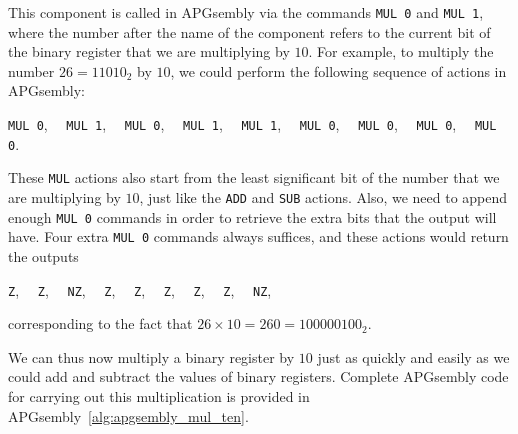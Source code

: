 This component is called in APGsembly via the commands \texttt{MUL 0} and \texttt{MUL 1}, where the number after the name of the component refers to the current bit of the binary register that we are multiplying by $10$. For example, to multiply the number $26 = 11010_2$ by $10$, we could perform the following sequence of actions in APGsembly:
\begin{center}
	\texttt{MUL 0}, \ \ \texttt{MUL 1}, \ \ \texttt{MUL 0}, \ \ \texttt{MUL 1}, \ \ \texttt{MUL 1}, \ \ \texttt{MUL 0}, \ \ \texttt{MUL 0}, \ \ \texttt{MUL 0}, \ \ \texttt{MUL 0}.
\end{center}
These \texttt{MUL} actions also start from the least significant bit of the number that we are multiplying by $10$, just like the \texttt{ADD} and \texttt{SUB} actions. Also, we need to append enough \texttt{MUL 0} commands in order to retrieve the extra bits that the output will have. Four extra \texttt{MUL 0} commands always suffices, and these actions would return the outputs
\begin{center}
	\leavevmode{}\texttt{Z}, \ \ \texttt{Z}, \ \ \texttt{NZ}, \ \ \texttt{Z}, \ \ \texttt{Z}, \ \ \texttt{Z}, \ \ \texttt{Z}, \ \ \texttt{Z}, \ \ \texttt{NZ},
\end{center}
corresponding to the fact that $26 \times 10 = 260 = 100000100_2$.

We can thus now multiply a binary register by $10$ just as quickly and easily as we could add and subtract the values of binary registers. Complete APGsembly code for carrying out this multiplication is provided in APGsembly~\ref{alg:apgsembly_mul_ten}.

